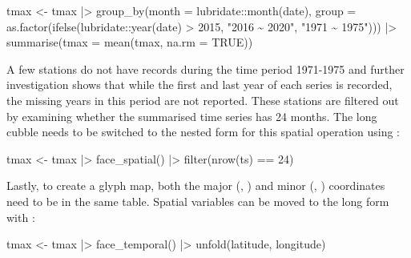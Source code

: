 \documentclass{article}
\newenvironment{Shaded}{\begin{snugshade}}{\end{snugshade}}
\newcommand{\AttributeTok}[1]{\textcolor[rgb]{0.77,0.63,0.00}{#1}}
\newcommand{\ConstantTok}[1]{\textcolor[rgb]{0.00,0.00,0.00}{#1}}
\newcommand{\DecValTok}[1]{\textcolor[rgb]{0.00,0.00,0.81}{#1}}
\newcommand{\FunctionTok}[1]{\textcolor[rgb]{0.00,0.00,0.00}{#1}}
\newcommand{\NormalTok}[1]{#1}
\newcommand{\OtherTok}[1]{\textcolor[rgb]{0.56,0.35,0.01}{#1}}
\newcommand{\SpecialCharTok}[1]{\textcolor[rgb]{0.00,0.00,0.00}{#1}}
\newcommand{\StringTok}[1]{\textcolor[rgb]{0.31,0.60,0.02}{#1}}
\begin{document}
\begin{Shaded}
\begin{Highlighting}[]
\NormalTok{tmax }\OtherTok{\textless{}{-}}\NormalTok{ tmax }\SpecialCharTok{|\textgreater{}}
  \FunctionTok{group\_by}\NormalTok{(}\AttributeTok{month =}\NormalTok{ lubridate}\SpecialCharTok{::}\FunctionTok{month}\NormalTok{(date),}
         \AttributeTok{group =} \FunctionTok{as.factor}\NormalTok{(}\FunctionTok{ifelse}\NormalTok{(lubridate}\SpecialCharTok{::}\FunctionTok{year}\NormalTok{(date) }\SpecialCharTok{\textgreater{}} \DecValTok{2015}\NormalTok{,}
                                  \StringTok{"2016 \textasciitilde{} 2020"}\NormalTok{, }\StringTok{"1971 \textasciitilde{} 1975"}\NormalTok{))) }\SpecialCharTok{|\textgreater{}}
  \FunctionTok{summarise}\NormalTok{(}\AttributeTok{tmax =} \FunctionTok{mean}\NormalTok{(tmax, }\AttributeTok{na.rm =} \ConstantTok{TRUE}\NormalTok{))}
\end{Highlighting}
\end{Shaded}

A few stations do not have records during the time period 1971-1975 and further investigation shows that while the first and last year of each series is recorded, the missing years in this period are not reported. These stations are filtered out by examining whether the summarised time series has 24 months. The long cubble needs to be switched to the nested form for this spatial operation using :

\begin{Shaded}
\begin{Highlighting}[]
\NormalTok{tmax }\OtherTok{\textless{}{-}}\NormalTok{ tmax }\SpecialCharTok{|\textgreater{}} \FunctionTok{face\_spatial}\NormalTok{() }\SpecialCharTok{|\textgreater{}} \FunctionTok{filter}\NormalTok{(}\FunctionTok{nrow}\NormalTok{(ts) }\SpecialCharTok{==} \DecValTok{24}\NormalTok{)}
\end{Highlighting}
\end{Shaded}

Lastly, to create a glyph map, both the major (, ) and minor (, ) coordinates need to be in the same table. Spatial variables can be moved to the long form with :

\begin{Shaded}
\begin{Highlighting}[]
\NormalTok{tmax }\OtherTok{\textless{}{-}}\NormalTok{ tmax }\SpecialCharTok{|\textgreater{}} \FunctionTok{face\_temporal}\NormalTok{() }\SpecialCharTok{|\textgreater{}} \FunctionTok{unfold}\NormalTok{(latitude, longitude)}
\end{Highlighting}
\end{Shaded}
\end{document}

